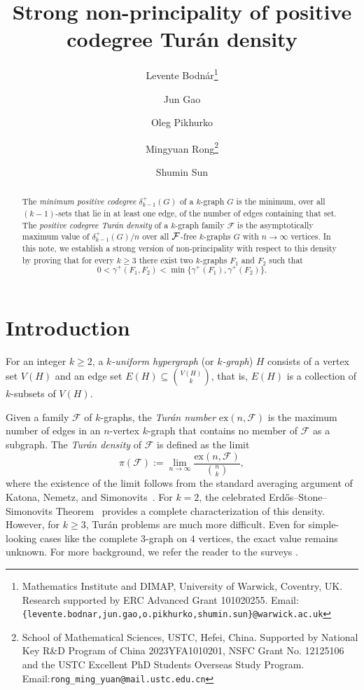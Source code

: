 \documentclass[11pt]{article}
\newcommand{\C}[1]{{\protect\cal #1}}
\begin{document}
\title{\bf\Large Strong non-principality of positive codegree Tur\'an density}
%
\date{}
\author{Levente Bodnár\thanks{Mathematics Institute and DIMAP, University of Warwick, Coventry, UK. Research supported by ERC Advanced Grant 101020255. Email: \texttt{\{levente.bodnar,jun.gao,o.pikhurko,shumin.sun\}@warwick.ac.uk}}
\and Jun Gao\footnotemark[1]
\and Oleg Pikhurko\footnotemark[1] 
\and Mingyuan Rong\thanks{School of Mathematical Sciences, USTC, Hefei, China. Supported by National Key R\&D Program of China 2023YFA1010201, NSFC Grant No. 12125106 and the USTC Excellent PhD Students Overseas Study Program. Email:\texttt{rong\_ming\_yuan@mail.ustc.edu.cn}}
\and Shumin Sun\footnotemark[1]}

\maketitle
\begin{abstract}
    The \emph{minimum positive codegree} $\delta^+_{k-1}(G)$ of a $k$-graph $G$
    is the minimum, over all $(k-1)$-sets that lie in at least one edge, of the number of edges containing that set. The \emph{positive codegree Tur\'an density} of a $k$-graph family $\mathcal{F}$ is the asymptotically maximum value of $\delta^+_{k-1}(G)/n$ over all $\C F$-free $k$-graphs $G$ with $n\to\infty$ vertices. In this note, we establish a strong version of non-principality with respect to this density by proving that  for every $k\ge3$ there exist two $k$-graphs $F_1$ and $F_2$ such that 
    $$
    0<\gamma^+(F_1, F_2) < \min\{\gamma^+(F_1), \gamma^+(F_2)\}.
    $$
\end{abstract}
\section{Introduction}

For an integer $k \geq 2$, a \textit{$k$-uniform hypergraph} (or \textit{$k$-graph}) $H$ consists of a vertex set $V(H)$ and an edge set $E(H) \subseteq \binom{V(H)}{k}$, that is, $E(H)$ is a collection of $k$-subsets of $V(H)$. 

Given a family $\mathcal{F}$ of $k$-graphs, the \textit{Tur\'an number} $\text{ex}(n, \mathcal{F})$ is the maximum number of edges in an $n$-vertex $k$-graph that contains no member of $\mathcal{F}$ as a subgraph. 
The \textit{Tur\'an density} of $\mathcal{F}$ is defined as the limit 
\[
\pi(\mathcal{F}) := \lim_{n \to \infty} \frac{\text{ex}(n, \mathcal{F})}{\binom{n}{k}},
\]
where the existence of the limit follows from the standard averaging argument of Katona, Nemetz, and Simonovits~\cite{KNS64}.
For $k=2$, the celebrated Erd\H{o}s--Stone--Simonovits Theorem~\cite{ES46,ES66} provides a complete characterization of this density. However, for $k \geq 3$, Tur\'an problems are much more difficult. Even for simple-looking cases like the complete $3$-graph on $4$ vertices, the exact value remains unknown. For more background, we refer the reader to the surveys \cite{kee11, sido95}.
\end{document}
